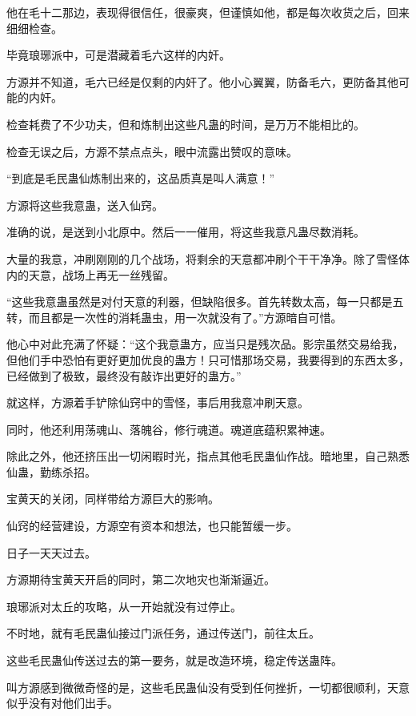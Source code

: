 \begin{this_body}
他在毛十二那边，表现得很信任，很豪爽，但谨慎如他，都是每次收货之后，回来细细检查。

毕竟琅琊派中，可是潜藏着毛六这样的内奸。

方源并不知道，毛六已经是仅剩的内奸了。他小心翼翼，防备毛六，更防备其他可能的内奸。

检查耗费了不少功夫，但和炼制出这些凡蛊的时间，是万万不能相比的。

检查无误之后，方源不禁点点头，眼中流露出赞叹的意味。

“到底是毛民蛊仙炼制出来的，这品质真是叫人满意！”

方源将这些我意蛊，送入仙窍。

准确的说，是送到小北原中。然后一一催用，将这些我意凡蛊尽数消耗。

大量的我意，冲刷刚刚的几个战场，将剩余的天意都冲刷个干干净净。除了雪怪体内的天意，战场上再无一丝残留。

“这些我意蛊虽然是对付天意的利器，但缺陷很多。首先转数太高，每一只都是五转，而且都是一次性的消耗蛊虫，用一次就没有了。”方源暗自可惜。

他心中对此充满了怀疑：“这个我意蛊方，应当只是残次品。影宗虽然交易给我，但他们手中恐怕有更好更加优良的蛊方！只可惜那场交易，我要得到的东西太多，已经做到了极致，最终没有敲诈出更好的蛊方。”

就这样，方源着手铲除仙窍中的雪怪，事后用我意冲刷天意。

同时，他还利用荡魂山、落魄谷，修行魂道。魂道底蕴积累神速。

除此之外，他还挤压出一切闲暇时光，指点其他毛民蛊仙作战。暗地里，自己熟悉仙蛊，勤练杀招。

宝黄天的关闭，同样带给方源巨大的影响。

仙窍的经营建设，方源空有资本和想法，也只能暂缓一步。

日子一天天过去。

方源期待宝黄天开启的同时，第二次地灾也渐渐逼近。

琅琊派对太丘的攻略，从一开始就没有过停止。

不时地，就有毛民蛊仙接过门派任务，通过传送门，前往太丘。

这些毛民蛊仙传送过去的第一要务，就是改造环境，稳定传送蛊阵。

叫方源感到微微奇怪的是，这些毛民蛊仙没有受到任何挫折，一切都很顺利，天意似乎没有对他们出手。

\end{this_body}

